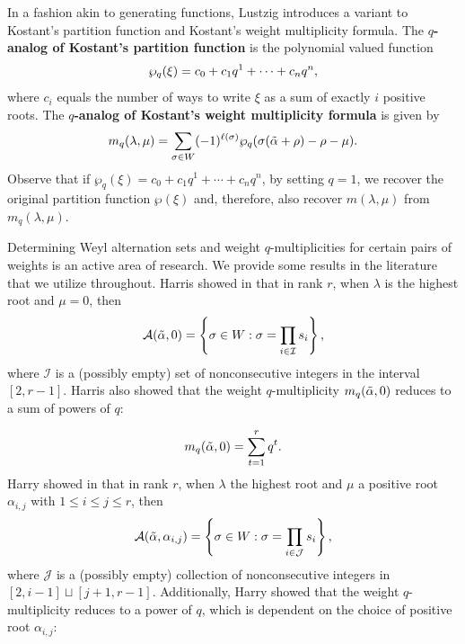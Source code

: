 \documentclass[10pt]{article}
\newcommand{\hr}[0]{\Tilde{\alpha}}
\begin{document}
In a fashion akin to generating functions, Lustzig \cite{Lustzig}
introduces a variant to Kostant's partition function and Kostant's weight multiplicity formula.
The \textbf{$q$-analog of Kostant's partition function} is the polynomial valued function 
    \begin{equation}
        \wp_q(\xi)=c_0+c_1q^1+\cdots+c_nq^n,\notag
    \end{equation}
    where $c_i$ equals the number of ways to write $\xi$ as a sum of exactly $i$ positive roots. The \textbf{$q$-analog of Kostant's weight multiplicity formula} is given by 
    \begin{equation}\label{eq: defn of q-analog}
        m_q(\lambda,\mu)=\sum_{\sigma\in W}(-1)^{\ell(\sigma)}\wp_q(\sigma(\hr+\rho)-\rho-\mu).\notag
    \end{equation}
Observe that if $\wp_q(\xi)=c_0+c_1q^1+\cdots+c_nq^n$, by setting $q=1$, we recover the original partition function $\wp(\xi)$ and, therefore, also recover $m(\lambda,\mu)$ from $m_q(\lambda,\mu)$.

Determining Weyl alternation sets and weight $q$-multiplicities for certain pairs of weights is an active area of research. We provide some results in the literature that we utilize throughout. 
Harris showed in \cite{HarrisThesis} that in rank $r$, when $\lambda$ is the highest root and $\mu=0$, then 
\begin{align}
    \mathcal{A}(\hr,0) = \left\{\sigma\in W: \sigma=\prod_{i\in\mathcal{I}}s_i\right\},\label{pamela alternation result}
\end{align}
where $\mathcal{I}$ is a (possibly empty) set of nonconsecutive integers in the interval $[2,r-1]$. Harris also showed that the weight $q$-multiplicity $m_q(\hr,0)$ reduces to a sum of powers of $q$:
 
\begin{equation}
    m_q(\hr,0)=\sum_{t=1}^r q^t.\label{eq: pamela result}
\end{equation}
Harry showed in \cite{harry2024computingqmultiplicitypositiveroots} that in rank $r$, when $\lambda$ the highest root and $\mu$ a positive root $\alpha_{i,j}$ with $1\leq i\leq j \leq r$, then 
\begin{equation}
    \mathcal{A}(\hr,\alpha_{i,j}) = \left\{\sigma\in W: \sigma=\prod_{i\in \mathcal{J}}s_i\right\}\label{kim alternation result},
\end{equation}
where $\mathcal{J}$ is a (possibly empty) collection of nonconsecutive integers in $[2,i-1]\sqcup [j+1,r-1]$. Additionally, Harry showed that the weight $q$-multiplicity reduces to a power of $q$, which is dependent on the choice of positive root $\alpha_{i,j}$: 
 
\end{document}
